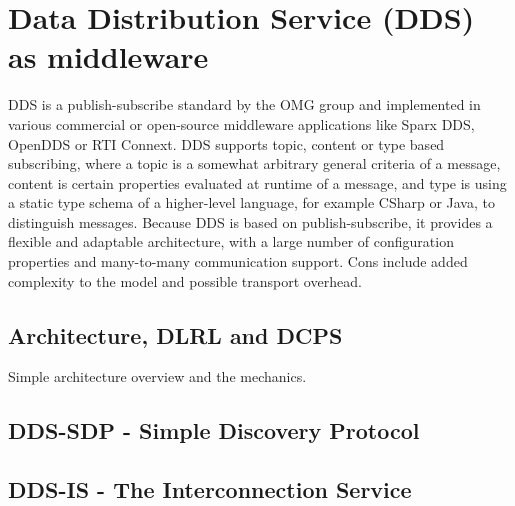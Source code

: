 \section{Data Distribution Service (DDS) as middleware}

DDS is a publish-subscribe standard by the OMG group and implemented in various commercial or open-source middleware applications like Sparx DDS, OpenDDS or RTI Connext. DDS supports topic, content or type based subscribing, where a topic is a somewhat arbitrary general criteria of a message, content is certain properties evaluated at runtime of a message, and type is using a static type schema of a higher-level language, for example CSharp or Java, to distinguish messages. Because DDS is based on publish-subscribe, it provides a flexible and adaptable architecture, with a large number of configuration properties and many-to-many communication support. Cons include added complexity to the model and possible transport overhead.

\subsection{Architecture, DLRL and DCPS}

Simple architecture overview and the mechanics.

\subsection{DDS-SDP - Simple Discovery Protocol}

\subsection{DDS-IS - The Interconnection Service}